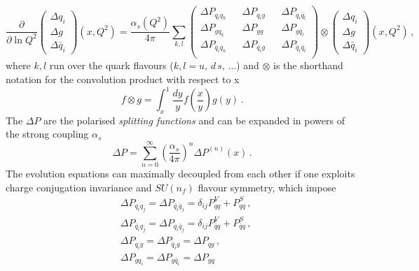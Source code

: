 \begin{equation}
  \frac{\partial}{\partial \ln Q^2} 
  \left(\begin{matrix}
    \Delta q_i \\
    \Delta g \\
    \Delta \bar{q}_i
  \end{matrix} \right) (x,Q^2) = \frac{\alpha_{s}(Q^2)}{4 \pi}  \sum_{k,l}
  \left(\begin{matrix}
    \Delta P_{q_i q_k} && \Delta P_{q_i g} && \Delta P_{q_i \bar{q}_l} \\
    \Delta P_{g q_k} && \Delta P_{g g} && \Delta P_{g \bar{q}_l} \\
    \Delta P_{\bar{q}_i q_k} && \Delta P_{\bar{q}_i g} && \Delta P_{\bar{q}_i \bar{q}_l} \\
  \end{matrix}\right) \otimes 
  \left(\begin{matrix}
    \Delta q_i \\
    \Delta g \\
    \Delta \bar{q}_i
  \end{matrix} \right) (x,Q^2) \,,
  \label{eq:DGLAP_coupled}
\end{equation}
where $k,l$ run over the quark flavours ($k,l = u,\, d\, s,\, \dots$) and $\otimes$ is the shorthand notation for the convolution product with respect to x
\begin{equation}
  f \otimes g = \int_{x}^{1} \frac{dy}{y} f \left(\frac{x}{y} \right) g(y) \,.
  \label{eq:def_conv}
\end{equation}
The $\Delta P$ are the polarised \textit{splitting functions} and can be expanded in powers of the strong coupling $\alpha_s$
\begin{equation}
  \Delta P = \sum_{n=0}^{\infty} \left( \frac{\alpha_s}{4\pi} \right)^{n} \Delta P^{(n)}(x)\,.
\end{equation}
The evolution equations can maximally decoupled from each other if one exploits charge conjugation invariance and $SU(n_f)$ flavour symmetry, which impose 
\begin{equation}
  \begin{split}
    & \Delta P_{q_i q_j} = \Delta P_{\bar{q}_i \bar{q}_j} = \delta_{ij} P_{qq}^{V} + P_{qq}^{S} \,,\\
    & \Delta P_{\bar{q}_i q_j} = \Delta P_{q_i \bar{q}_j} = \delta_{ij} P_{\bar{q}q}^{V} + P_{\bar{q}q}^{S} \,,\\
    & \Delta P_{q_i g} = \Delta P_{\bar{q}_i g} = \Delta P_{qg} \,, \\
    & \Delta P_{g q_i} = \Delta P_{g \bar{q}_i} = \Delta P_{gq}
  \end{split}
\end{equation}
